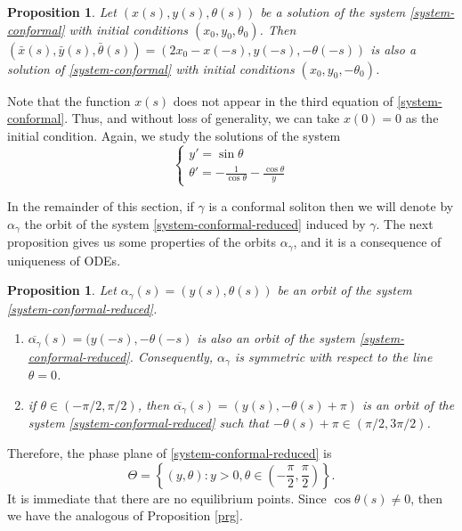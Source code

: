 \documentclass[12pt]{amsart}
\theoremstyle{plain}
\newtheorem{proposition}[theorem]{Proposition}
\theoremstyle{definition}
\begin{document}
\begin{proposition} 
\label{prop:sym}
Let $(x(s), y(s), \theta(s))$ be a solution of the system \eqref{system-conformal} with initial conditions $(x_0, y_0, \theta_0)$. Then   $(\bar{x}(s),\bar{y}(s),\bar{\theta}(s))=(2x_0-x(-s), y(-s), -\theta(-s))$ is also a solution of  \eqref{system-conformal} with initial conditions $(x_0,y_0,-\theta_0)$. 
\end{proposition}
 
 Note that the function $x(s)$ does not appear in the third equation of \eqref{system-conformal}. Thus, and without loss of generality, we can take $x(0)=0$ as the initial condition. Again, we  study the solutions of the   system
\begin{equation}
\label{system-conformal-reduced}
\begin{cases}
   y' = \sin\theta \\
   \displaystyle \theta ' = - \frac{1}{\cos\theta} - \frac{\cos\theta}{y}
\end{cases}
\end{equation}

In the remainder of this section, if $\gamma$ is a conformal soliton then we will denote by $\alpha_\gamma$ the orbit of the system \eqref{system-conformal-reduced} induced by $\gamma$. The next proposition gives us some properties of the orbits $\alpha_\gamma$, and it is a consequence of uniqueness of ODEs.

\begin{proposition}
    Let $\alpha_\gamma(s)=(y(s),\theta(s))$ be an orbit of the system \eqref{system-conformal-reduced}.
    \begin{enumerate}
	\item $\overline{\alpha_\gamma}(s) = (y(-s), - \theta(-s)$ is also an orbit of the system \eqref{system-conformal-reduced}. Consequently, $\alpha_\gamma$ is symmetric with respect to the line $\theta = 0$.

	\item if $\theta \in (-\pi/2, \pi / 2)$, then $\overline{\alpha_\gamma}(s) = (y(s), -\theta(s) + \pi)$ is an orbit of the system \eqref{system-conformal-reduced} such that $-\theta(s) + \pi \in (\pi / 2, 3\pi/2)$.
       
    \end{enumerate}
\end{proposition}

Therefore, the phase plane of   \eqref{system-conformal-reduced} is  
$$\Theta= \left\{(y,\theta)\colon y>0,\theta\in(-\frac{\pi}{2},\frac{\pi}{2}) \right \}.$$
It is immediate that there are no equilibrium points. Since $\cos\theta(s)\not=0$, then we have the analogous of Proposition \ref{prg}.
\end{document}

